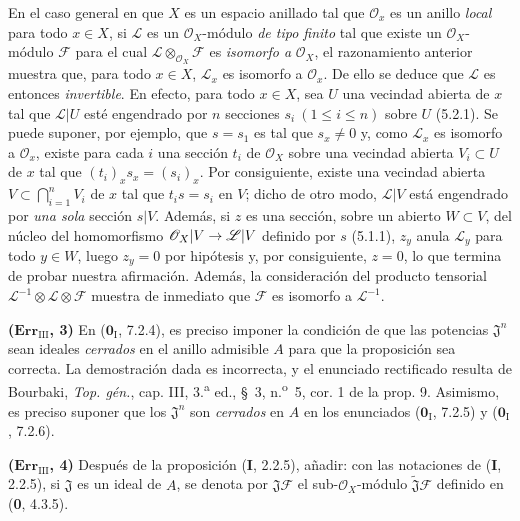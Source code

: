 \documentclass[10pt,oneside,openany]{book}
\theoremstyle{egaenv}\newtheorem*{env}{---}
\theoremstyle{egastatement}
\theoremstyle{egadescription}
\newcommand{\oldpage}[2][]{\marginnote{\normalfont\scriptsize\textbf{#1}\,|\,#2}\ignorespaces}
\renewcommand{\leq}{\leqslant}
\renewcommand{\to}{\mathchoice{\longrightarrow}{\rightarrow}{\rightarrow}{\rightarrow}}
\begin{document}
En el caso general en que $X$ es un espacio anillado tal que $\mathscr O_x$ es
un anillo \emph{local} para
\oldpage[III]{219}
todo $x\in X$, si $\mathscr L$ es un $\mathscr O_X$-módulo \emph{de tipo finito}
tal que existe un $\mathscr O_X$-módulo $\mathscr F$ para el cual
$\mathscr L\otimes_{\mathscr O_X}\mathscr F$ es \emph{isomorfo a}
$\mathscr O_X$, el razonamiento anterior muestra que, para todo $x\in X$,
$\mathscr L_x$ es isomorfo a $\mathscr O_x$. De ello se deduce que $\mathscr L$
es entonces \emph{invertible}. En efecto, para todo $x\in X$, sea $U$ una
vecindad abierta de $x$ tal que $\mathscr L|U$ esté engendrado por $n$ secciones
$s_i\ (1\leq i\leq n)$ sobre $U$ (5.2.1). Se puede suponer, por ejemplo, que
$s=s_1$ es tal que $s_x\ne0$ y, como $\mathscr L_x$ es isomorfo a
$\mathscr O_x$, existe para cada $i$ una sección $t_i$ de $\mathscr O_X$ sobre
una vecindad abierta $V_i\subset U$ de $x$ tal que
$(t_i)_x s_x=(s_i)_x$. Por consiguiente, existe una vecindad abierta
$V\subset\bigcap_{i=1}^nV_i$ de $x$ tal que $t_i s=s_i$ en $V$; dicho de otro
modo, $\mathscr L|V$ está engendrado por \emph{una sola} sección $s|V$. Además,
si $z$ es una sección, sobre un abierto $W\subset V$, del núcleo del
homomorfismo $\mathscr O_X|V\to\mathscr L|V$ definido por $s$ (5.1.1), $z_y$
anula $\mathscr L_y$ para todo $y\in W$, luego $z_y=0$ por hipótesis y, por
consiguiente, $z=0$, lo que termina de probar nuestra afirmación. Además, la
consideración del producto tensorial
$\mathscr L^{-1}\otimes\mathscr L\otimes\mathscr F$ muestra de inmediato que
$\mathscr F$ es isomorfo a $\mathscr L^{-1}$.

\noindent\textbf{($\mathbf{Err}_{\mathrm{III}}$, 3)} En
($\mathbf{0}_{\mathrm I}$, 7.2.4), es preciso imponer la condición de que las potencias
$\mathfrak J^n$ sean ideales \emph{cerrados} en el anillo admisible $A$ para
que la proposición sea correcta. La demostración dada es incorrecta, y el
enunciado rectificado resulta de Bourbaki, \emph{Top. gén.}, cap. III,
3.\textsuperscript{a} ed., \S~3, n.\textsuperscript{o}~5, cor. 1 de la prop. 9.
Asimismo, es preciso suponer que los $\mathfrak J^n$ son \emph{cerrados} en $A$
en los enunciados ($\mathbf{0}_{\mathrm I}$, 7.2.5) y ($\mathbf{0}_{\mathrm I}$, 7.2.6).

\noindent\textbf{($\mathbf{Err}_{\mathrm{III}}$, 4)} Después de la
proposición (\textbf I, 2.2.5), añadir: con las notaciones de (\textbf I, 2.2.5), si
$\mathfrak J$ es un ideal de $A$, se denota por
$\mathfrak J\mathscr F$ el sub-$\mathscr O_X$-módulo
$\widetilde{\mathfrak J}\mathscr F$ definido en (\textbf{0}, 4.3.5).
\end{document}
